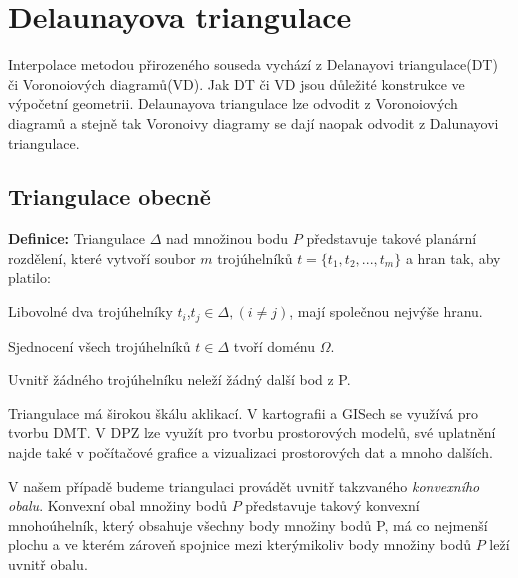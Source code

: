 \documentclass[12pt,a4paper]{article}
\begin{document}
\newpage
\section{Delaunayova triangulace}
Interpolace metodou přirozeného souseda vychází z Delanayovi triangulace(DT) či Voronoiových diagramů(VD). Jak DT či VD jsou důležité konstrukce ve výpočetní geometrii. Delaunayova triangulace lze odvodit z Voronoiových diagramů a stejně tak Voronoivy diagramy se dají naopak odvodit z Dalunayovi triangulace.

\subsection{Triangulace obecně}
\textbf{Definice:}
Triangulace $\Delta$ nad množinou bodu $P$ představuje takové planární rozdělení, které vytvoří soubor $m$ trojúhelníků $t = \{ t_1, t_2,...,t_m \}$ a hran tak, aby platilo:

Libovolné dva trojúhelníky $t_i$,$t_j \in \Delta, (i \neq j)$, mají společnou nejvýše hranu.

Sjednocení všech trojúhelníků $t \in \Delta$ tvoří doménu $\Omega$.

Uvnitř žádného trojúhelníku neleží žádný další bod z P.

\bigskip
Triangulace má širokou škálu aklikací. V kartografii a GISech se využívá pro tvorbu DMT. V DPZ lze využít pro tvorbu prostorových modelů, své uplatnění najde také v počítačové grafice a vizualizaci prostorových dat a mnoho dalších.

V našem případě budeme triangulaci provádět uvnitř takzvaného \textit{konvexního obalu}. Konvexní obal množiny bodů $P$ představuje takový konvexní mnohoúhelník, který obsahuje všechny body množiny bodů P, má co nejmenší plochu a ve kterém zároveň spojnice mezi kterýmikoliv body množiny bodů $P$ leží uvnitř obalu.
\end{document}
